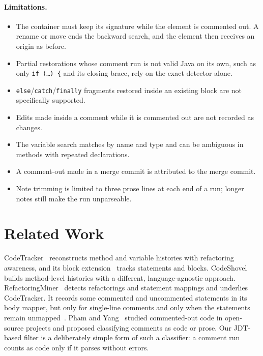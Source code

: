\documentclass[11pt,a4paper]{article}
\newcommand{\code}[1]{\texttt{#1}}
\begin{document}
\paragraph{Limitations.}
\begin{itemize}
  \item The container must keep its signature while the element is commented out. A rename or move ends the backward search, and the element then receives an origin as before.
  \item Partial restorations whose comment run is not valid Java on its own, such as only \code{if (\ldots) \{} and its closing brace, rely on the exact detector alone.
  \item \code{else}/\code{catch}/\code{finally} fragments restored inside an existing block are not specifically supported.
  \item Edits made inside a comment while it is commented out are not recorded as changes.
  \item The variable search matches by name and type and can be ambiguous in methods with repeated declarations.
  \item A comment-out made in a merge commit is attributed to the merge commit.
  \item Note trimming is limited to three prose lines at each end of a run; longer notes still make the run unparseable.
\end{itemize}

\section{Related Work}
CodeTracker~\cite{jodavi2022} reconstructs method and variable histories with refactoring awareness, and its block extension~\cite{hasan2024} tracks statements and blocks. CodeShovel~\cite{grund2021} builds method-level histories with a different, language-agnostic approach. RefactoringMiner~\cite{tsantalis2022} detects refactorings and statement mappings and underlies CodeTracker. It records some commented and uncommented statements in its body mapper, but only for single-line comments and only when the statements remain unmapped~\cite{report2}. Pham and Yang~\cite{pham2020} studied commented-out code in open-source projects and proposed classifying comments as code or prose. Our JDT-based filter is a deliberately simple form of such a classifier: a comment run counts as code only if it parses without errors.
\end{document}

